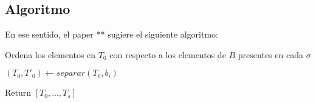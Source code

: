 \documentclass[12pt, letterpaper, twoside]{article}
\begin{document}
    \subsection{Algoritmo}
    \par En ese sentido, el paper ** sugiere el siguiente algoritmo:
    \begin{algorithm}
        \caption{Ordena los elementos en $T_0$ con respecto a los elementos de $B$ presentes en cada $\sigma$}
        \label{CardinalSort}
        \begin{algorithmic}[1]
            \State $(T_0, T'_0) \leftarrow separar(T_0, b_i)$
            
            \EndFor
            \EndFor
            \State Return $[T_0,...,T_s]$
            \EndProcedure
        \end{algorithmic}
    \end{algorithm}
    
\end{document}
